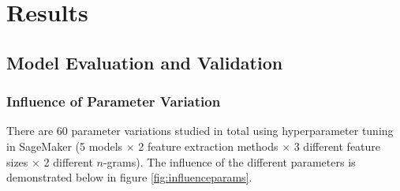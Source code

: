 \documentclass[a4paper,12pt,nottoc]{article}
\begin{document}
\clearpage
\section{Results}

\subsection{Model Evaluation and Validation}

\subsubsection{Influence of Parameter Variation}

There are 60 parameter variations studied in total using hyperparameter tuning in SageMaker \cite{bib:sagemaker} (5 models $\times$ 2 feature extraction methods $\times$ 3 different feature sizes $\times$ 2 different $n$-grams). The influence of the different parameters is demonstrated below in figure \ref{fig:influenceparams}.
\end{document}
